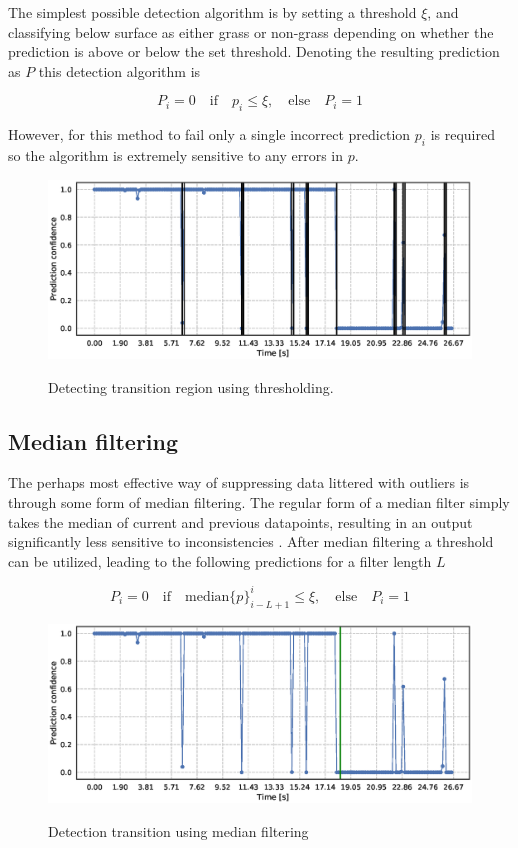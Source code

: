 The simplest possible detection algorithm is by setting a threshold $\xi$, and classifying below surface as either grass or non-grass depending on whether the prediction is above or below the set threshold. Denoting the resulting prediction as $P$ this detection algorithm is 

\begin{equation}
	P_i=0 \quad\text{if}\quad p_i\leq\xi, \quad
	\text{else} \quad P_i=1
\end{equation}

However, for this method to fail only a single incorrect prediction $p_i$ is required so the algorithm is extremely sensitive to any errors in $p$.

\begin{figure}
	\includegraphics[scale=0.5]{figs_temp/detect_thresh}
	\label{fig:detect_thresh}
	\caption{Detecting transition region using thresholding.}
\end{figure}

\subsection{Median filtering}

The perhaps most effective way of suppressing data littered with outliers is through some form of median filtering. The regular form of a median filter simply takes the median of current and previous datapoints, resulting in an output significantly less sensitive to inconsistencies \citep{pearson_2002}. After median filtering a threshold can be utilized, leading to the following predictions for a filter length $L$

\begin{equation}
	P_i=0 \quad\text{if}\quad\text{median}\{p\}_{i-L+1}^i\leq\xi, 
	\quad \text{else} \quad P_i = 1
\end{equation}

\begin{figure}
	\includegraphics[scale=0.5]{figs_temp/detect_median}
	\label{fig:detect_median}
	\caption{Detection transition using median filtering}
\end{figure}

